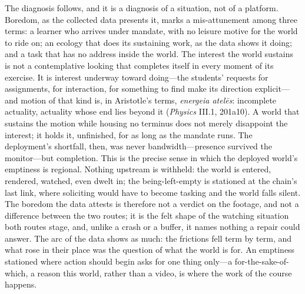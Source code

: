 The diagnosis follows, and it is a diagnosis of a situation, not of a
platform. Boredom, as the collected data presents it, marks a
mis-attunement among three terms: a learner who arrives under mandate,
with no leisure motive for the world to ride on; an ecology that does
its sustaining work, as the data shows it doing; and a task that has
no address inside the world. The interest the world sustains is not a
contemplative looking that completes itself in every moment of its
exercise. It is interest underway toward doing---the students'
requests for assignments, for
interaction, for something to find make its direction explicit---and
motion of that kind is, in Aristotle's terms, \textit{energeia
atelēs}: incomplete actuality, actuality whose end lies beyond it
(\textit{Physics} III.1, 201a10). A world that sustains the motion
while housing no terminus does not merely disappoint the interest; it
holds it, unfinished, for as long as the mandate runs. The
deployment's shortfall, then, was never bandwidth---presence survived
the monitor---but completion. This is the precise sense in which the
deployed world's emptiness is regional. Nothing upstream is withheld:
the world is entered, rendered, watched, even dwelt in; the
being-left-empty is stationed at the chain's last link, where
soliciting would have to become tasking and the world falls silent.
The boredom the data attests is therefore not a verdict on the
footage, and not a difference between the two routes; it is the felt
shape of the watching situation both routes stage, and, unlike a crash
or a buffer, it names nothing a repair could answer. The arc of the
data shows as much: the frictions fell term by term, and what rose in
their place was the question of what the world is for. An emptiness
stationed where action should begin asks for one thing only---a
for-the-sake-of-which, a reason this world, rather than a video, is
where the work of the course happens.

